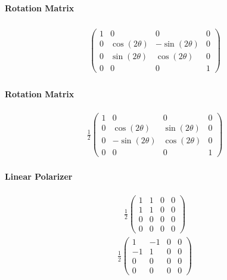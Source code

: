 \paragraph{Rotation Matrix}
\begin{align}
\begin{split}
\begin{pmatrix}
    1 &                0 &               0 & 0 \\
    0 & \cos{(2\theta)} & -\sin{(2\theta)} & 0 \\
    0 & \sin{(2\theta)} & \cos{(2\theta)} & 0 \\
    0 &                0 &               0 & 1
  \end{pmatrix}
\end{split}
\end{align}
% 
\paragraph{Rotation Matrix}
\begin{align}
\frac{1}{2}
\begin{pmatrix}
    1 &                0 &               0 & 0 \\
    0 &  \cos{(2\theta)} & \sin{(2\theta)} & 0 \\
    0 & -\sin{(2\theta)} & \cos{(2\theta)} & 0 \\
    0 &                0 &               0 & 1
\end{pmatrix}
\end{align}
% 
\paragraph{Linear Polarizer}
\begin{align}
\frac{1}{2}
\begin{pmatrix}
    1 & 1 & 0 & 0 \\
    1 & 1 & 0 & 0 \\
    0 & 0 & 0 & 0 \\
    0 & 0 & 0 & 0
  \end{pmatrix}
\end{align}
\begin{align}
\frac{1}{2}
\begin{pmatrix}
     1 & -1 & 0 & 0 \\
    -1 &  1 & 0 & 0 \\
     0 &  0 & 0 & 0 \\
     0 &  0 & 0 & 0
\end{pmatrix}
\end{align}
% 
